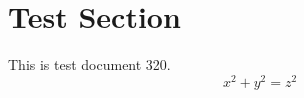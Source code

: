 \documentclass{article}
\begin{document}
\section{Test Section}
This is test document 320.
\begin{equation}
x^2 + y^2 = z^2
\end{equation}
\end{document}
